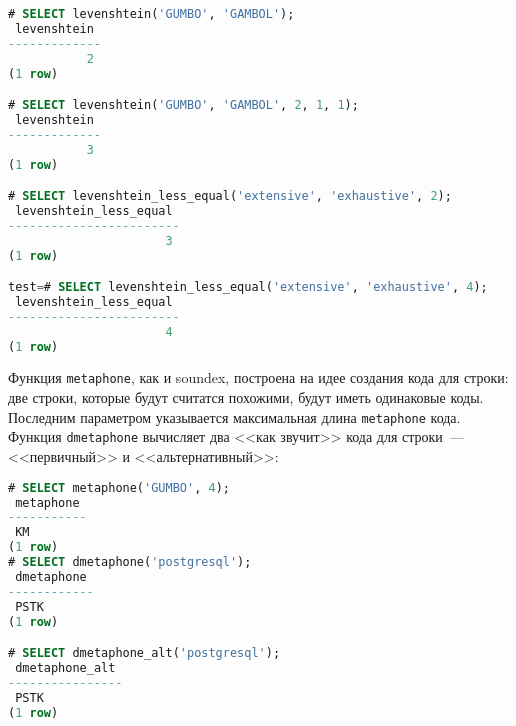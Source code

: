 \begin{lstlisting}[language=SQL,label=lst:ext_fuzzystrmatch2,caption=levenshtein]
# SELECT levenshtein('GUMBO', 'GAMBOL');
 levenshtein
-------------
           2
(1 row)

# SELECT levenshtein('GUMBO', 'GAMBOL', 2, 1, 1);
 levenshtein
-------------
           3
(1 row)

# SELECT levenshtein_less_equal('extensive', 'exhaustive', 2);
 levenshtein_less_equal
------------------------
                      3
(1 row)

test=# SELECT levenshtein_less_equal('extensive', 'exhaustive', 4);
 levenshtein_less_equal
------------------------
                      4
(1 row)
\end{lstlisting}

Функция \lstinline!metaphone!, как и soundex, построена на идее создания кода для строки: две строки, которые будут считатся похожими, будут иметь одинаковые коды. Последним параметром указывается максимальная длина \lstinline!metaphone! кода. Функция \lstinline!dmetaphone! вычисляет два <<как звучит>> кода для строки~--- <<первичный>> и <<альтернативный>>:

\begin{lstlisting}[language=SQL,label=lst:ext_fuzzystrmatch3,caption=metaphone]
# SELECT metaphone('GUMBO', 4);
 metaphone
-----------
 KM
(1 row)
# SELECT dmetaphone('postgresql');
 dmetaphone
------------
 PSTK
(1 row)

# SELECT dmetaphone_alt('postgresql');
 dmetaphone_alt
----------------
 PSTK
(1 row)
\end{lstlisting}


